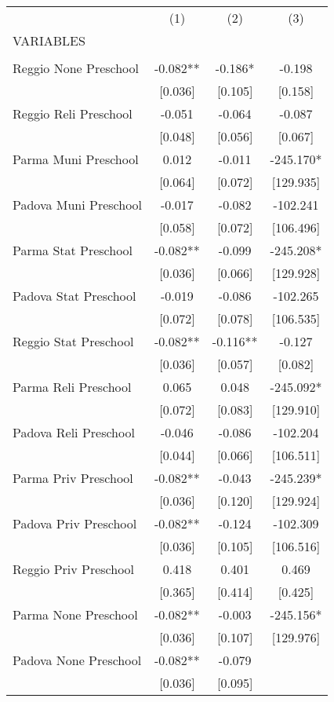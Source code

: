 \begin{tabular}{lccc} \hline
 & (1) & (2) & (3) \\
VARIABLES &  &  &  \\ \hline
 &  &  &  \\
Reggio None Preschool & -0.082** & -0.186* & -0.198 \\
 & [0.036] & [0.105] & [0.158] \\
Reggio Reli Preschool & -0.051 & -0.064 & -0.087 \\
 & [0.048] & [0.056] & [0.067] \\
Parma Muni Preschool & 0.012 & -0.011 & -245.170* \\
 & [0.064] & [0.072] & [129.935] \\
Padova Muni Preschool & -0.017 & -0.082 & -102.241 \\
 & [0.058] & [0.072] & [106.496] \\
Parma Stat Preschool & -0.082** & -0.099 & -245.208* \\
 & [0.036] & [0.066] & [129.928] \\
Padova Stat Preschool & -0.019 & -0.086 & -102.265 \\
 & [0.072] & [0.078] & [106.535] \\
Reggio Stat Preschool & -0.082** & -0.116** & -0.127 \\
 & [0.036] & [0.057] & [0.082] \\
Parma Reli Preschool & 0.065 & 0.048 & -245.092* \\
 & [0.072] & [0.083] & [129.910] \\
Padova Reli Preschool & -0.046 & -0.086 & -102.204 \\
 & [0.044] & [0.066] & [106.511] \\
Parma Priv Preschool & -0.082** & -0.043 & -245.239* \\
 & [0.036] & [0.120] & [129.924] \\
Padova Priv Preschool & -0.082** & -0.124 & -102.309 \\
 & [0.036] & [0.105] & [106.516] \\
Reggio Priv Preschool & 0.418 & 0.401 & 0.469 \\
 & [0.365] & [0.414] & [0.425] \\
Parma None Preschool & -0.082** & -0.003 & -245.156* \\
 & [0.036] & [0.107] & [129.976] \\
Padova None Preschool & -0.082** & -0.079 &  \\
 & [0.036] & [0.095] &  \\

\end{tabular}

